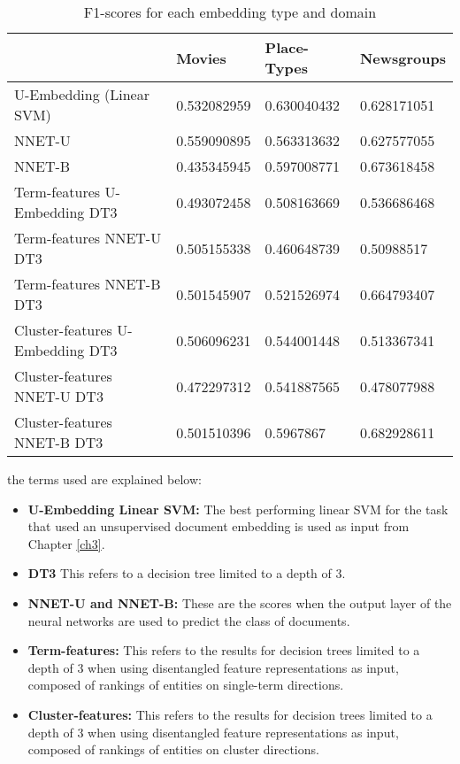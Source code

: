 \begin{table}[]
	\centering
\begin{tabular}{llll}
		& \textbf{Movies}      & \textbf{Place-Types}  & \textbf{Newsgroups}  \\
	\toprule
	U-Embedding (Linear SVM)   & 0.532082959 & 0.630040432 & 0.628171051 \\
	NNET-U                      & 0.559090895 & 0.563313632 & 0.627577055 \\
	NNET-B                      & 0.435345945 & 0.597008771 & 0.673618458 \\
	Term-features U-Embedding DT3 & 0.493072458 & 0.508163669 & 0.536686468 \\
	Term-features NNET-U DT3       & 0.505155338 & 0.460648739 & 0.50988517  \\
	Term-features NNET-B DT3       & 0.501545907 & 0.521526974 & 0.664793407 \\
	Cluster-features U-Embedding DT3   & 0.506096231 & 0.544001448 & 0.513367341 \\
	Cluster-features NNET-U DT3         & 0.472297312 & 0.541887565 & 0.478077988 \\
	Cluster-features NNET-B DT3         & 0.501510396 & 0.5967867   & 0.682928611
\end{tabular}\caption{F1-scores for each embedding type and domain}\label{ch5:quantresults}
\end{table}

 the terms used are explained below:

\begin{itemize}
	\item \textbf{U-Embedding Linear SVM:} The best performing linear SVM for the task that used an unsupervised document embedding is used as input  from Chapter \ref{ch3}.
	\item \textbf{DT3} This refers to a decision tree limited to a depth of 3.
	\item \textbf{NNET-U and NNET-B:} These are the scores when the output layer of the neural networks are used to predict the class of documents. 
	\item \textbf{Term-features:} This refers to the results for decision trees limited to a depth of 3 when using  disentangled feature representations as input, composed of rankings of entities on single-term directions.
	\item \textbf{Cluster-features:} This refers to the results for decision trees limited to a depth of 3 when using  disentangled feature representations as input, composed of rankings of entities on cluster directions.
\end{itemize}

